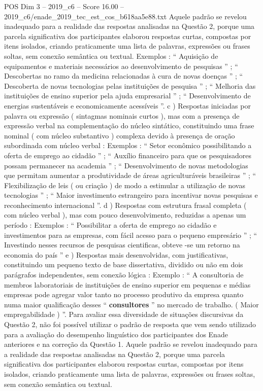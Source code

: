 \begin{textsample}{POS Dim 3 – 2019\_c6 – Score 16.00 – 2019\_c6/enade\_2019\_tec\_est\_cos\_b618aa5e88.txt}
Aquele padrão se revelou inadequado para a realidade das respostas analisadas na Questão 2, porque uma parcela significativa dos participantes elaborou respostas curtas, compostas por itens isolados, criando praticamente uma lista de palavras, expressões ou frases soltas, sem conexão semântica ou textual.
Exemplos : “ Aquisição de equipamentos e materiais necessários ao desenvolvimento de pesquisas ” ; “ Descobertas no ramo da medicina relacionadas à cura de novas doenças ” ; “ Descoberta de novas tecnologias pelas instituições de pesquisa ” ; “ Melhoria das instituições de ensino superior pela ajuda empresarial ” ; “ Desenvolvimento de energias sustentáveis e economicamente acessíveis ”. c ) Respostas iniciadas por palavra ou expressão ( sintagmas nominais curtos ), mas com a presença de expressão verbal na complementação do núcleo sintático, constituindo uma frase nominal ( com núcleo substantivo ) complexa devido à presença de oração subordinada com núcleo verbal : Exemplos : “ Setor econômico possibilitando a oferta de emprego ao cidadão ” ; “ Auxílio financeiro para que os pesquisadores possam permanecer na academia ” ; “ Desenvolvimento de novas metodologias que permitam aumentar a produtividade de áreas agriculturáveis brasileiras ” ; “ Flexibilização de leis ( ou criação ) de modo a estimular a utilização de novas tecnologias ” ; “ Maior investimento estrangeiro para incentivar novas pesquisas e reconhecimento internacional ”. d ) Respostas com estrutura frasal completa ( com núcleo verbal ), mas com pouco desenvolvimento, reduzidas a apenas um período : Exemplos : “ Possibilitar a oferta de emprego ao cidadão e investimentos para as empresas, com fácil acesso para o pequeno empresário ” ; “ Investindo nesses recursos de pesquisas cientificas, obteve -se um retorno na economia do país ” e ) Respostas mais desenvolvidas, com justificativas, constituindo um pequeno texto de base dissertativa, dividido ou não em dois parágrafos independentes, sem conexão lógica : Exemplo : “ A consultoria de membros laboratoriais de instituições de ensino superior em pequenas e médias empresas pode agregar valor tanto no processo produtivo da empresa quanto numa maior qualificação desses “ \textbf{consultores} ” no mercado de trabalho. ( Maior empregabilidade ) ”.
Para avaliar essa diversidade de situações discursivas da Questão 2, não foi possível utilizar o padrão de resposta que vem sendo utilizado para a avaliação do desempenho linguístico dos participantes dos Enade anteriores e na correção da Questão 1.
Aquele padrão se revelou inadequado para a realidade das respostas analisadas na Questão 2, porque uma parcela significativa dos participantes elaborou respostas curtas, compostas por itens isolados, criando praticamente uma lista de palavras, expressões ou frases soltas, sem conexão semântica ou textual.

\end{textsample}
